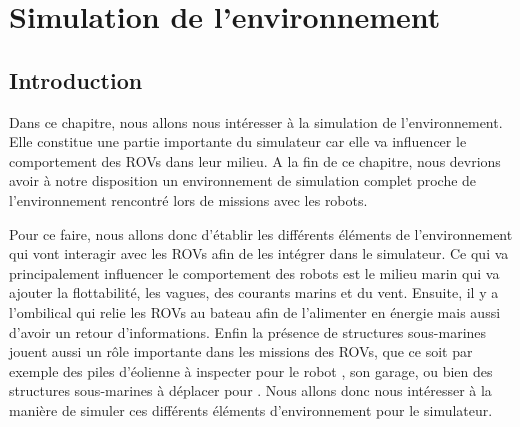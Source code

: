 \chapter{Simulation de l'environnement}
\label{chapitre:environnement}
	
	\section{Introduction}

		Dans ce chapitre, nous allons nous intéresser à la simulation de l'environnement. Elle constitue une partie importante du simulateur car elle va influencer le comportement des \gls{ROV}s dans leur milieu.  A la fin de ce chapitre, nous devrions avoir à notre disposition un environnement de simulation complet proche de l'environnement rencontré lors de missions avec les robots.

		Pour ce faire, nous allons donc d'établir les différents éléments de l'environnement qui vont interagir avec les \gls{ROV}s afin de les intégrer dans le simulateur. Ce qui va principalement influencer le comportement des robots est le milieu marin qui va ajouter la flottabilité, les vagues, des courants marins et du vent. Ensuite, il y a l'ombilical qui relie les \gls{ROV}s au bateau afin de l'alimenter en énergie mais aussi d'avoir un retour d'informations. Enfin la présence de structures sous-marines jouent aussi un rôle importante dans les missions des \gls{ROV}s, que ce soit par exemple des piles d'éolienne à inspecter pour le robot \argos{}, son garage, ou bien des structures sous-marines à déplacer pour \atoll{}. Nous allons donc nous intéresser à la manière de simuler ces différents éléments d'environnement pour le simulateur.



